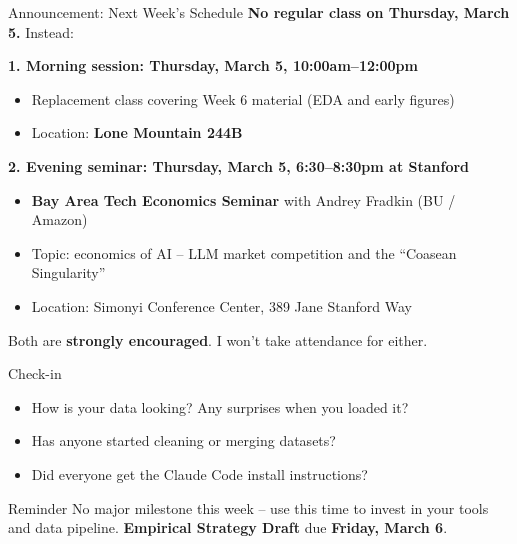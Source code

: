 \begin{frame}{Announcement: Next Week's Schedule}
  \textbf{No regular class on Thursday, March 5.} Instead:

  \vspace{8pt}

  \textbf{1. Morning session: Thursday, March 5, 10:00am--12:00pm}
  \begin{itemize}
    \item Replacement class covering Week 6 material (EDA and early figures)
    \item Location: \textbf{Lone Mountain 244B}
  \end{itemize}

  \vspace{8pt}

  \textbf{2. Evening seminar: Thursday, March 5, 6:30--8:30pm at Stanford}
  \begin{itemize}
    \item \textbf{Bay Area Tech Economics Seminar} with Andrey Fradkin (BU / Amazon)
    \item Topic: economics of AI -- LLM market competition and the ``Coasean Singularity''
    \item Location: Simonyi Conference Center, 389 Jane Stanford Way
  \end{itemize}

  \vspace{8pt}

  Both are \textbf{strongly encouraged}. I won't take attendance for either.
\end{frame}

\begin{frame}{Check-in}
  \begin{itemize}
    \item How is your data looking? Any surprises when you loaded it?
    \item Has anyone started cleaning or merging datasets?
    \item Did everyone get the Claude Code install instructions?
  \end{itemize}
  \vspace{12pt}
  \begin{block}{Reminder}
    No major milestone this week -- use this time to invest in your tools and data pipeline.
    \textbf{Empirical Strategy Draft} due \textbf{Friday, March 6}.
  \end{block}
\end{frame}


